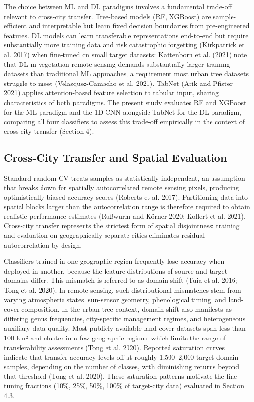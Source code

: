 \documentclass[11pt,a4paper]{scrartcl}
\begin{document}
The choice between ML and DL paradigms involves a fundamental trade-off
relevant to cross-city transfer. Tree-based models (RF, XGBoost) are
sample-efficient and interpretable but learn fixed decision boundaries
from pre-engineered features. DL models can learn transferable
representations end-to-end but require substantially more training data
and risk catastrophic forgetting (Kirkpatrick et al. 2017) when
fine-tuned on small target datasets: Kattenborn et al. (2021) note that
DL in vegetation remote sensing demands substantially larger training
datasets than traditional ML approaches, a requirement most urban tree
datasets struggle to meet ({Velasquez-Camacho et al.} 2021). TabNet
(Arik and Pfister 2021) applies attention-based feature selection to
tabular input, sharing characteristics of both paradigms. The present
study evaluates RF and XGBoost for the ML paradigm and the 1D-CNN
alongside TabNet for the DL paradigm, comparing all four classifiers to
assess this trade-off empirically in the context of cross-city transfer
(Section 4).

\subsection{Cross-City Transfer and Spatial
Evaluation}\label{cross-city-transfer-and-spatial-evaluation}

Standard random CV treats samples as statistically independent, an
assumption that breaks down for spatially autocorrelated remote sensing
pixels, producing optimistically biased accuracy scores (Roberts et al.
2017). Partitioning data into spatial blocks larger than the
autocorrelation range is therefore required to obtain realistic
performance estimates (Rußwurm and Körner 2020; Kollert et al. 2021).
Cross-city transfer represents the strictest form of spatial
disjointness: training and evaluation on geographically separate cities
eliminates residual autocorrelation by design.

Classifiers trained in one geographic region frequently lose accuracy
when deployed in another, because the feature distributions of source
and target domains differ. This mismatch is referred to as domain shift
(Tuia et al. 2016; Tong et al. 2020). In remote sensing, such
distributional mismatches stem from varying atmospheric states,
sun-sensor geometry, phenological timing, and land-cover composition. In
the urban tree context, domain shift also manifests as differing genus
frequencies, city-specific management regimes, and heterogeneous
auxiliary data quality. Most publicly available land-cover datasets span
less than 100 km² and cluster in a few geographic regions, which limits
the range of transferability assessments (Tong et al. 2020). Reported
saturation curves indicate that transfer accuracy levels off at roughly
1,500--2,000 target-domain samples, depending on the number of classes,
with diminishing returns beyond that threshold (Tong et al. 2020). These
saturation patterns motivate the fine-tuning fractions (10\%, 25\%,
50\%, 100\% of target-city data) evaluated in Section 4.3.
\end{document}

